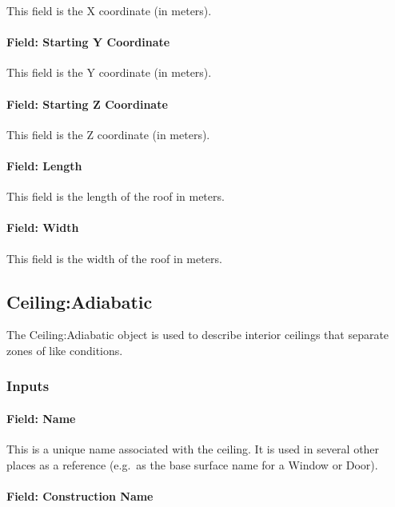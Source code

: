 This field is the X coordinate (in meters).

\paragraph{Field: Starting Y Coordinate}\label{field-starting-y-coordinate-4}

This field is the Y coordinate (in meters).

\paragraph{Field: Starting Z Coordinate}\label{field-starting-z-coordinate-4}

This field is the Z coordinate (in meters).

\paragraph{Field: Length}\label{field-length-4}

This field is the length of the roof in meters.

\paragraph{Field: Width}\label{field-width}

This field is the width of the roof in meters.

\subsection{Ceiling:Adiabatic}\label{ceilingadiabatic}

The Ceiling:Adiabatic object is used to describe interior ceilings that separate zones of like conditions.

\subsubsection{Inputs}\label{inputs-9-024}

\paragraph{Field: Name}\label{field-name-5-026}

This is a unique name associated with the ceiling. It is used in several other places as a reference (e.g.~as the base surface name for a Window or Door).

\paragraph{Field: Construction Name}\label{field-construction-name-5}

